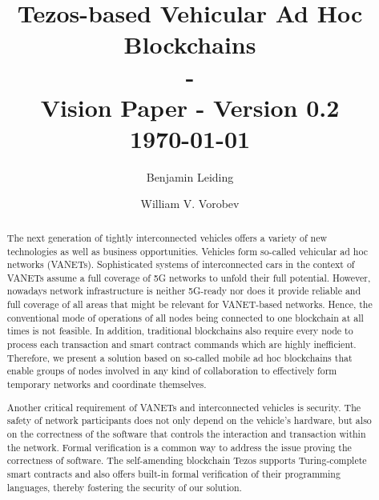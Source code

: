 \documentclass{llncs}
\begin{document}
	{
	\title{Tezos-based Vehicular Ad Hoc Blockchains\\ - \\ \small Vision Paper - Version 0.2\\\small \today}
	
	\author{Benjamin Leiding \and William V. Vorobev}
	
	
	\maketitle


	\begin{abstract}


		The next generation of tightly interconnected vehicles offers a variety of new technologies as well as business opportunities. Vehicles form so-called vehicular ad hoc networks (VANETs). Sophisticated systems of interconnected cars in the context of VANETs assume a full coverage of 5G networks to unfold their full potential. However, nowadays network infrastructure is neither 5G-ready nor does it provide reliable and full coverage of all areas that might be relevant for VANET-based networks. Hence, the conventional mode of operations of all nodes being connected to one blockchain at all times is not feasible. In addition, traditional blockchains also require every node to process each transaction and smart contract commands which are highly inefficient. Therefore, we present a solution based on so-called mobile ad hoc blockchains that enable groups of nodes involved in any kind of collaboration to effectively form temporary networks and coordinate themselves. 

		Another critical requirement of VANETs and interconnected vehicles is security. The safety of network participants does not only depend on the vehicle's hardware, but also on the correctness of the software that controls the interaction and transaction within the network. Formal verification is a common way to address the issue proving the correctness of software. The self-amending blockchain Tezos supports Turing-complete smart contracts and also offers built-in formal verification of their programming languages, thereby fostering the security of our solution.


\end{abstract}}
\end{document}
